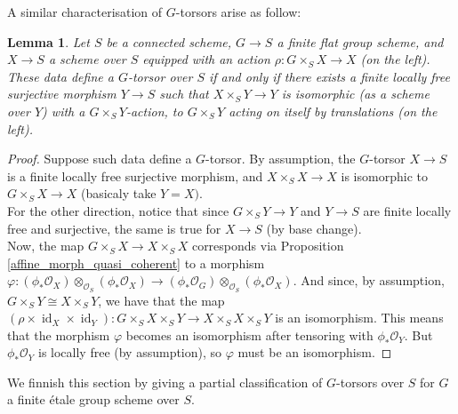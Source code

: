 \documentclass{article}
\theoremstyle{plain}
\newtheorem{lemma}[theorem]{Lemma}
\theoremstyle{definition}
\DeclareMathOperator{\id}{id}
\begin{document}
\noindent A similar characterisation of $G$-torsors arise as follow:
\begin{lemma}
\label{other_charac_torsors}
    Let $S$ be a connected scheme, $G\rightarrow S$ a finite flat group scheme, and $X\rightarrow S$ a scheme over $S$ equipped with an action $\rho: G\times_SX \rightarrow X$ (on the left).
    These data define a $G$-torsor over $S$ if and only if there exists a finite locally free surjective morphism $Y\rightarrow S$ such that $X\times_SY\rightarrow Y$ is isomorphic (as a scheme over $Y$) with a $G\times_SY$-action, to $G\times_SY$ acting on itself by translations (on the left).
\end{lemma}
\begin{proof}
    Suppose such data define a $G$-torsor.
    By assumption, the $G$-torsor $X\rightarrow S$ is a finite locally free surjective morphism, and $X\times_SX\rightarrow X$ is isomorphic to $G\times_SX\rightarrow X$ (basicaly take $Y=X)$.\\
    For the other direction, notice that since $G\times_S Y\rightarrow Y$ and $Y\rightarrow S$ are finite locally free and surjective, the same is true for $X\rightarrow S$ (by base change).\\
    Now, the map $G\times_SX\rightarrow X\times_SX$ corresponds via Proposition \ref{affine_morph_quasi_coherent}
    to a morphism $\varphi :(\phi_*\mathcal{O}_X)\otimes_{\mathcal{O}_S}(\phi_*\mathcal{O}_X) \rightarrow (\phi_*\mathcal{O}_G)\otimes_{\mathcal{O}_S}(\phi_*\mathcal{O}_X)$.
    And since, by assumption, $G\times_S Y\cong X\times_SY$, we have that the map $(\rho \times \id_X\times \id_Y) : G\times_SX\times_SY\rightarrow X\times_S X\times_S Y$ is an isomorphism.
    This means that the morphism $\varphi$ becomes an isomorphism after tensoring with $\phi_*\mathcal{O}_Y$.
    But $\phi_*\mathcal{O}_Y$ is locally free (by assumption), so $\varphi$ must be an isomorphism.
\end{proof}

\noindent We finnish this section by giving a partial classification of $G$-torsors over $S$ for $G$ a finite \'etale group scheme over $S$.
\end{document}
